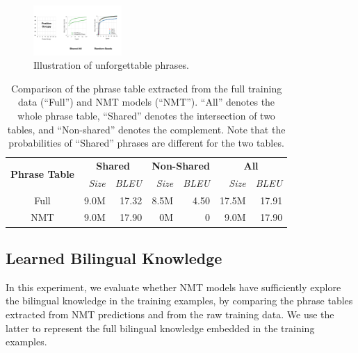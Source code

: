 \documentclass[11pt,a4paper]{article}
\begin{document}
\begin{figure}[t]
    \centering
    \includegraphics[width=0.30\textwidth]{figures/phrase_forget.pdf}
\caption{Illustration of unforgettable phrases.}
\label{fig:phrase_forget}
\end{figure}



\begin{table}[t]
\begin{center}
 \begin{tabular}{c|r|r|r|r|r|r}
  \multirow{2}{*}{\bf Phrase Table}  &  \multicolumn{2}{c|}{\bf Shared} &   \multicolumn{2}{c|}{\bf Non-Shared}  &  \multicolumn{2}{c}{\bf All}\\
  \cline{2-7}
        &  \em Size    & \em BLEU  &   \em Size   & \em BLEU  &   \em Size    & \em BLEU\\
  \hline
  \hline
  Full      &   9.0M   &   17.32   &   8.5M   &   4.50    &  { 17.5M }   &    17.91\\
  \hline
  NMT       &   9.0M   &  17.90  &   0M   &   0   &   {9.0M }  & 17.90\\
 \end{tabular} 
\end{center}
\caption{Comparison of the phrase table extracted from the full training data (``Full'') and NMT models (``NMT''). 
``All'' denotes the whole phrase table, ``Shared'' denotes the intersection of two tables, and ``Non-shared'' denotes the complement. Note that the probabilities of ``Shared'' phrases are different for the two tables.}
\label{table:knowledge-distillation}
\end{table}


\subsection{Learned Bilingual Knowledge}
\label{sec:knowledge}

In this experiment, we evaluate whether NMT models have sufficiently explore the bilingual knowledge in the training examples, by comparing the phrase tables extracted from NMT predictions and from the raw training data. We use the latter to represent the full bilingual knowledge embedded in the training examples. 
\end{document}

